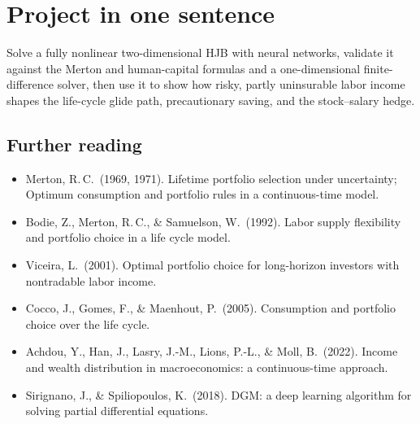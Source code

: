 \documentclass[11pt]{article}
\begin{document}
\section{Project in one sentence}

\begin{keyidea}
Solve a fully nonlinear two-dimensional HJB with neural networks, validate it
against the Merton and human-capital formulas and a one-dimensional
finite-difference solver, then use it to show how risky, partly uninsurable labor
income shapes the life-cycle glide path, precautionary saving, and the
stock--salary hedge.
\end{keyidea}

\subsection*{Further reading}
\begin{itemize}
  \item Merton, R.\,C.\ (1969, 1971). Lifetime portfolio selection under uncertainty;
        Optimum consumption and portfolio rules in a continuous-time model.
  \item Bodie, Z., Merton, R.\,C., \& Samuelson, W.\ (1992). Labor supply flexibility
        and portfolio choice in a life cycle model.
  \item Viceira, L.\ (2001). Optimal portfolio choice for long-horizon investors with
        nontradable labor income.
  \item Cocco, J., Gomes, F., \& Maenhout, P.\ (2005). Consumption and portfolio choice
        over the life cycle.
  \item Achdou, Y., Han, J., Lasry, J.-M., Lions, P.-L., \& Moll, B.\ (2022). Income and
        wealth distribution in macroeconomics: a continuous-time approach.
  \item Sirignano, J., \& Spiliopoulos, K.\ (2018). DGM: a deep learning algorithm for
        solving partial differential equations.
\end{itemize}
\end{document}
